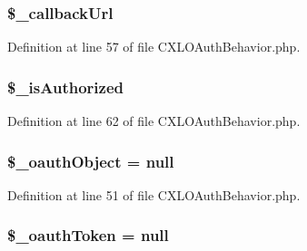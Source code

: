 \hypertarget{classCXLOAuthBehavior_ade40e32a04ba6dd22db9f6204218b60b}{
\subsubsection[{\$\_\-callbackUrl}]{\setlength{\rightskip}{0pt plus 5cm}\$\_\-callbackUrl}}
\label{classCXLOAuthBehavior_ade40e32a04ba6dd22db9f6204218b60b}


Definition at line 57 of file CXLOAuthBehavior.php.

\hypertarget{classCXLOAuthBehavior_a1065be3580f4c6c6ecaeb45613525347}{
\subsubsection[{\$\_\-isAuthorized}]{\setlength{\rightskip}{0pt plus 5cm}\$\_\-isAuthorized}}
\label{classCXLOAuthBehavior_a1065be3580f4c6c6ecaeb45613525347}


Definition at line 62 of file CXLOAuthBehavior.php.

\hypertarget{classCXLOAuthBehavior_a3059e962acd36df1674d78ce69d3a733}{
\subsubsection[{\$\_\-oauthObject}]{\setlength{\rightskip}{0pt plus 5cm}\$\_\-oauthObject = null}}
\label{classCXLOAuthBehavior_a3059e962acd36df1674d78ce69d3a733}


Definition at line 51 of file CXLOAuthBehavior.php.

\hypertarget{classCXLOAuthBehavior_aea10c78c73d6333bc3bbc369b78da62e}{
\subsubsection[{\$\_\-oauthToken}]{\setlength{\rightskip}{0pt plus 5cm}\$\_\-oauthToken = null}}
\label{classCXLOAuthBehavior_aea10c78c73d6333bc3bbc369b78da62e}


